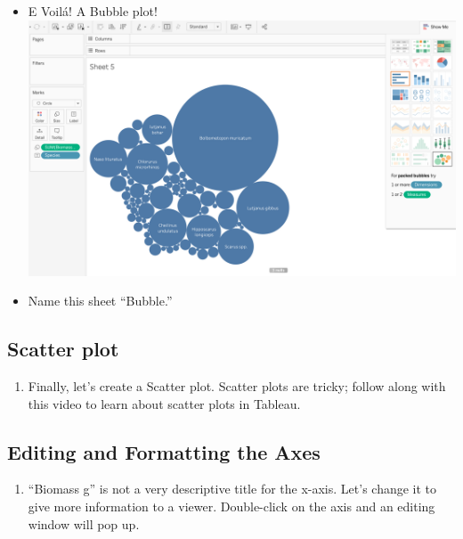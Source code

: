 \documentclass[
]{book}
\providecommand{\tightlist}{%
  \setlength{\itemsep}{0pt}\setlength{\parskip}{0pt}}
\begin{document}
\begin{enumerate}
\begin{itemize}
  \item
    E Voilá! A Bubble plot!
    \includegraphics{images/M3S2_bubble-plot.png}
  \item
    Name this sheet ``Bubble.''
  \end{itemize}
\end{enumerate}

\hypertarget{scatter-plot}{%
\subsection{Scatter plot}\label{scatter-plot}}

\begin{enumerate}
\def\labelenumi{\arabic{enumi}.}
\tightlist
\item
  Finally, let's create a Scatter plot. Scatter plots are tricky; follow along with this video to learn about scatter plots in Tableau.
\end{enumerate}

\hypertarget{editing-and-formatting-the-axes}{%
\subsection{Editing and Formatting the Axes}\label{editing-and-formatting-the-axes}}

\begin{enumerate}
\def\labelenumi{\arabic{enumi}.}
\tightlist
\item
  ``Biomass g'' is not a very descriptive title for the x-axis. Let's change it to give more information to a viewer. Double-click on the axis and an editing window will pop up.
\end{enumerate}
\end{document}
